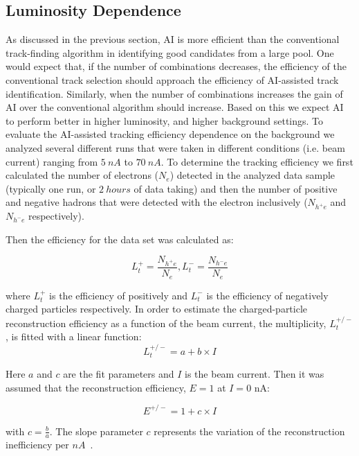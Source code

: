 \subsection{Luminosity Dependence}

As discussed in the previous section, AI is more efficient than the conventional track-finding 
algorithm in identifying good candidates from a large pool. One would expect that, if the number 
of combinations decreases, the efficiency of the conventional track selection should approach the 
efficiency of AI-assisted track identification. Similarly, when the number of combinations 
increases the gain of AI over the conventional algorithm should increase. Based on this we 
expect AI to perform better in higher luminosity, and higher background settings. To evaluate the 
AI-assisted tracking efficiency dependence on the background we analyzed several different runs 
that were taken in different conditions (i.e. beam current) ranging from $5~nA$ to $70~nA$. 
To determine the tracking efficiency we first calculated the number of electrons ($N_e$) detected 
in the analyzed data sample (typically one run, or $2~hours$ of data taking) and then the number of 
positive and negative hadrons that were detected with the electron inclusively ($N_{h^+e}$ and 
$N_{h^-e}$ respectively).

Then the efficiency for the data set was calculated as:

\begin{equation}
L_t^+ = \frac{N_{h^+e}}{N_e} , L_t^- = \frac{N_{h^-e}}{N_e} 
\end{equation}

where $L_t^+$ is the efficiency of positively and $L_t^-$ is the efficiency of negatively 
charged particles respectively. In order to estimate the charged-particle reconstruction efficiency 
as a function of the beam current, the multiplicity, $L_t^{+/-}$, is fitted with a linear function:
\begin{equation}
L_t^{+/-} = a + b\times I 
\end{equation}

Here $a$ and $c$ are the fit parameters and $I$ is the beam current. Then it was assumed that the 
reconstruction efficiency, $E=1$ at $I=0$ nA:

\begin{equation}
E^{+/-} = 1 + c \times I 
\end{equation}

with $c=\frac{b}{a}$. The slope parameter $c$ represents the variation of the reconstruction 
inefficiency per $nA$~\cite{Stepanyan:2020bg}.
 
